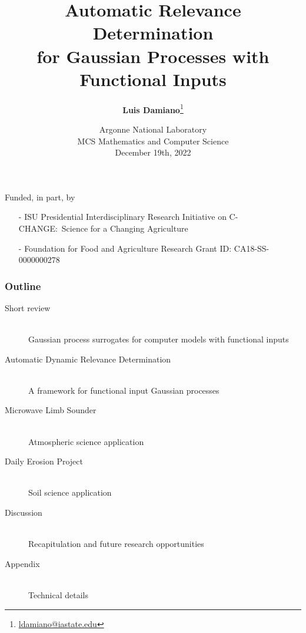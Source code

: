\documentclass{snedecorbeamer}
\title{\textbf{Automatic Relevance Determination} \\
  for Gaussian Processes with Functional Inputs}
\author[Damiano et al]{
  \textbf{Luis Damiano}\footnote[2]{
    \tiny{\href{mailto:ldamiano@iastate.edu}{ldamiano@iastate.edu}}
  }}
\institute{
  Department of Statistics, Iowa State University
}
\date[December 19th, 2022]{
  \tiny{Argonne National Laboratory \\
    MCS Mathematics and Computer Science} \\
  December 19th, 2022}
\begin{document}
\begin{frame}
  \titlepage{}
  {
    \tiny{
      Funded, in part, by
      \begin{itemize}
      \item[-] ISU Presidential Interdisciplinary
	Research Initiative on C-CHANGE:~Science for a Changing
	Agriculture
      \item[-] Foundation for Food and Agriculture Research
	Grant ID: CA18-SS-0000000278
      \end{itemize}
    }
  }
\end{frame}

\begin{frame}
  \frametitle{Outline}

  \begingroup
  \begin{description}
  \item[Short review] \mbox{}\\
    Gaussian process surrogates for computer models with functional inputs
  \item[Automatic Dynamic Relevance Determination] \mbox{}\\
    A framework for functional input Gaussian processes
  \item[Microwave Limb Sounder] \mbox{}\\
    Atmospheric science application
  \item[Daily Erosion Project] \mbox{}\\
    Soil science application
  \item[Discussion] \mbox{}\\
    Recapitulation and future research opportunities
  \item[Appendix] \mbox{}\\
    Technical details
  \end{description}
  \endgroup





\end{frame}
\end{document}
